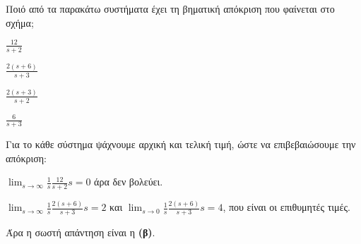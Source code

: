 \documentclass[11pt,a4paper,notitlepage,fleqn,final]{article}
\begin{document}
\begin{exercise}
Ποιό από τα παρακάτω συστήματα έχει τη βηματική απόκριση που φαίνεται στο σχήμα;


\begin{enumlatin}
	\item \( \displaystyle \frac{12}{s+2} \)
	\item \( \displaystyle \frac{2(s+6)}{s+3} \)
	\item \( \displaystyle \frac{2(s+3)}{s+2} \)
	\item \( \displaystyle \frac{6}{s+3} \)
\end{enumlatin}

\tcblower

Για το κάθε σύστημα ψάχνουμε αρχική και τελική τιμή, ώστε να επιβεβαιώσουμε την απόκριση:
\begin{enumlatin}
	\item \( \displaystyle \lim_{s\to \infty}
	\frac{1}{s} \frac{12}{s+2} s = 0
	 \) άρα δεν βολεύει.
	\item \( \displaystyle \lim_{s\to \infty} \frac{1}{s}\frac{2(s+6)}{s+3}s=2 \)
	και \( \displaystyle \lim_{s\to 0} \frac{1}{s}\frac{2(s+6)}{s+3}s=4  \), που είναι οι
	επιθυμητές τιμές.
\end{enumlatin}

Άρα η σωστή απάντηση είναι η \textbf{(β)}.

\end{exercise}
\end{document}
